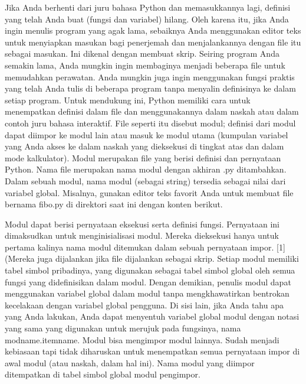 Jika Anda berhenti dari juru bahasa Python dan memasukkannya lagi, definisi yang telah Anda buat (fungsi dan variabel) hilang. Oleh karena itu, jika Anda ingin menulis program yang agak lama, sebaiknya Anda menggunakan editor teks untuk menyiapkan masukan bagi penerjemah dan menjalankannya dengan file itu sebagai masukan. Ini dikenal dengan membuat skrip. Seiring program Anda semakin lama, Anda mungkin ingin membaginya menjadi beberapa file untuk memudahkan perawatan. Anda mungkin juga ingin menggunakan fungsi praktis yang telah Anda tulis di beberapa program tanpa menyalin definisinya ke dalam setiap program.
Untuk mendukung ini, Python memiliki cara untuk menempatkan definisi dalam file dan menggunakannya dalam naskah atau dalam contoh juru bahasa interaktif. File seperti itu disebut modul; definisi dari modul dapat diimpor ke modul lain atau masuk ke modul utama (kumpulan variabel yang Anda akses ke dalam naskah yang dieksekusi di tingkat atas dan dalam mode kalkulator).
Modul merupakan file yang berisi definisi dan pernyataan Python. Nama file merupakan nama modul dengan akhiran .py ditambahkan. Dalam sebuah modul, nama modul (sebagai string) tersedia sebagai nilai dari variabel global. Misalnya, gunakan editor teks favorit Anda untuk membuat file bernama fibo.py di direktori saat ini dengan konten berikut. 

Modul dapat berisi pernyataan eksekusi serta definisi fungsi. Pernyataan ini dimaksudkan untuk menginisialisasi modul. Mereka dieksekusi hanya untuk pertama kalinya nama modul ditemukan dalam sebuah pernyataan impor. [1] (Mereka juga dijalankan jika file dijalankan sebagai skrip.
Setiap modul memiliki tabel simbol pribadinya, yang digunakan sebagai tabel simbol global oleh semua fungsi yang didefinisikan dalam modul. Dengan demikian, penulis modul dapat menggunakan variabel global dalam modul tanpa mengkhawatirkan bentrokan kecelakaan dengan variabel global pengguna. Di sisi lain, jika Anda tahu apa yang Anda lakukan, Anda dapat menyentuh variabel global modul dengan notasi yang sama yang digunakan untuk merujuk pada fungsinya, nama modname.itemname.
Modul bisa mengimpor modul lainnya. Sudah menjadi kebiasaan tapi tidak diharuskan untuk menempatkan semua pernyataan impor di awal modul (atau naskah, dalam hal ini). Nama modul yang diimpor ditempatkan di tabel simbol global modul pengimpor.

